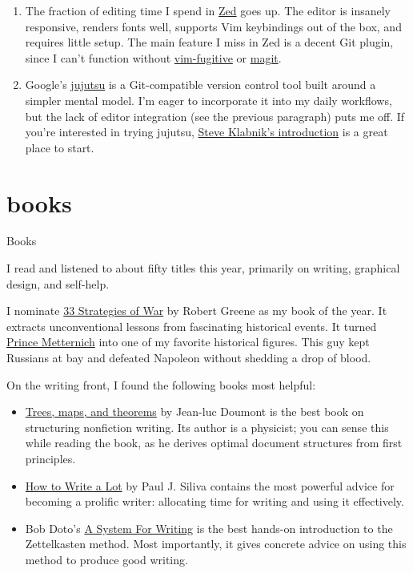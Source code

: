 \documentclass{article}
\begin{document}
\begin{enumerate}
\item
The fraction of editing time I spend in \href{https://zed.dev/}{Zed} goes up.
The editor is insanely responsive, renders fonts well, supports Vim keybindings out of the box, and requires little setup.
The main feature I miss in Zed is a decent Git plugin, since I can’t function without \href{https://github.com/tpope/vim-fugitive}{vim-fugitive} or \href{https://magit.vc/}{magit}.

\item
Google's \href{https://github.com/jj-vcs/jj}{jujutsu} is a Git-compatible version control tool built around a simpler mental model.
I'm eager to incorporate it into my daily workflows, but the lack of editor integration (see the previous paragraph) puts me off.
If you're interested in trying jujutsu, \href{https://steveklabnik.github.io/jujutsu-tutorial/introduction/introduction.html}{Steve Klabnik's introduction} is a great place to start.
\end{enumerate}

\section{books}{Books}

I read and listened to about fifty titles this year, primarily on writing, graphical design, and self-help.

I nominate \href{https://www.goodreads.com/book/show/35289.The_33_Strategies_of_War}{33 Strategies of War} by Robert Greene as my book of the year.
It extracts unconventional lessons from fascinating historical events.
It turned \href{https://en.wikipedia.org/wiki/Klemens_von_Metternich}{Prince Metternich} into one of my favorite historical figures.
This guy kept Russians at bay and defeated Napoleon without shedding a drop of blood.

On the writing front, I found the following books most helpful:
\begin{itemize}
\item
\href{https://www.goodreads.com/book/show/6477103-trees-maps-and-theorems}{Trees, maps, and theorems} by Jean-luc Doumont is the best book on structuring nonfiction writing.
Its author is a physicist; you can sense this while reading the book, as he derives optimal document structures from first principles.
\item
\href{https://www.goodreads.com/book/show/39874447-how-to-write-a-lot}{How to Write a Lot} by Paul J. Siliva contains the most powerful advice for becoming a prolific writer:
allocating time for writing and using it effectively.
\item
Bob Doto's \href{https://www.goodreads.com/book/show/214971755-a-system-for-writing}{A System For Writing} is the best hands-on introduction to the Zettelkasten method.
Most importantly, it gives concrete advice on using this method to produce good writing.
\end{itemize}
\end{document}
